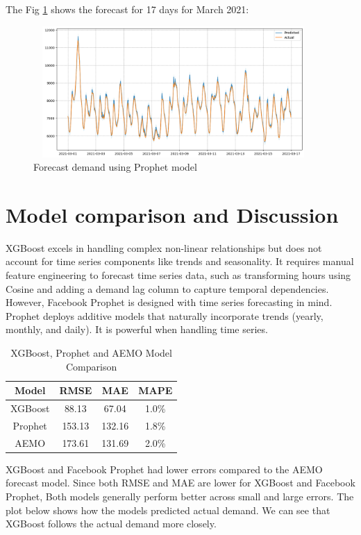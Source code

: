 \documentclass[mstat,12pt]{unswthesis}
\begin{document}
The Fig \ref{prophet_actual_predict_output} shows the forecast for 17
days for March 2021:

\begin{figure}[H]
\centering
\includegraphics[width=0.95\textwidth, height=5cm]{prophet_actual_predict_output.png}
\caption{Forecast demand using Prophet model}\label{prophet_actual_predict_output}
\end{figure}

\chapter{Model comparison and
Discussion}\label{model-comparison-and-discussion}

XGBoost excels in handling complex non-linear relationships but does not
account for time series components like trends and seasonality. It
requires manual feature engineering to forecast time series data, such
as transforming hours using Cosine and adding a demand lag column to
capture temporal dependencies. However, Facebook Prophet is designed
with time series forecasting in mind. Prophet deploys additive models
that naturally incorporate trends (yearly, monthly, and daily). It is
powerful when handling time series.

\begin{table}[h]
\centering
\caption{XGBoost, Prophet and AEMO Model Comparison}
\begin{tabular}{|c|c|c|c|}
\hline
\hline
\textbf{Model} & \textbf{RMSE} & \textbf{MAE} & \textbf{MAPE}\\ 
\hline
XGBoost & 88.13 & 67.04 & 1.0\% \\ 
\hline
Prophet & 153.13 & 132.16 & 1.8\% \\ 
\hline
AEMO & 173.61 & 131.69 & 2.0\% \\ 
\hline
\end{tabular}
\end{table}

XGBoost and Facebook Prophet had lower errors compared to the AEMO
forecast model. Since both RMSE and MAE are lower for XGBoost and
Facebook Prophet, Both models generally perform better across small and
large errors. The plot below shows how the models predicted actual
demand. We can see that XGBoost follows the actual demand more closely.
\end{document}
